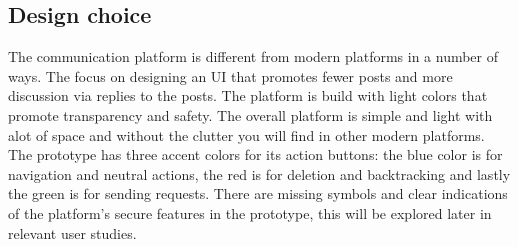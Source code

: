 \subsection{Design choice}
The communication platform is different from modern platforms in a number of ways. The focus on designing an UI that promotes fewer posts and more discussion via replies to the posts. The platform is build with light colors that promote transparency and safety. The overall platform is simple and light with alot of space and without the clutter you will find in other modern platforms. The prototype has three accent colors for its action buttons: the blue color is for navigation and neutral actions, the red is for deletion and backtracking and lastly the green is for sending requests. There are missing symbols and clear indications of the platform's secure features in the prototype, this will be explored later in relevant user studies.


